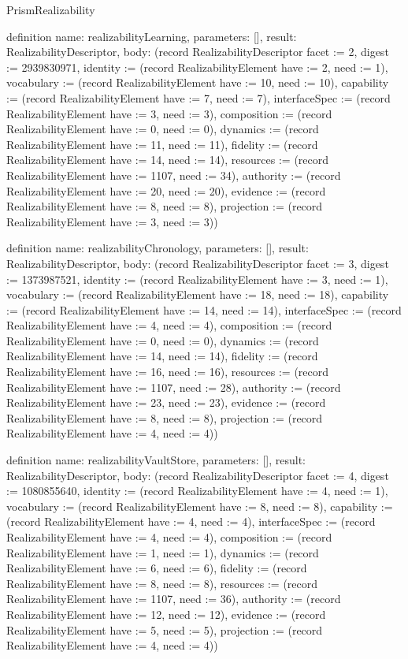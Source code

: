 \begin{lexlean}{PrismRealizability}
\begin{semanticmodule}
definition{
  name: realizabilityLearning,
  parameters: [],
  result: RealizabilityDescriptor,
  body: (record RealizabilityDescriptor {facet := 2, digest := 2939830971, identity := (record RealizabilityElement {have := 2, need := 1}), vocabulary := (record RealizabilityElement {have := 10, need := 10}), capability := (record RealizabilityElement {have := 7, need := 7}), interfaceSpec := (record RealizabilityElement {have := 3, need := 3}), composition := (record RealizabilityElement {have := 0, need := 0}), dynamics := (record RealizabilityElement {have := 11, need := 11}), fidelity := (record RealizabilityElement {have := 14, need := 14}), resources := (record RealizabilityElement {have := 1107, need := 34}), authority := (record RealizabilityElement {have := 20, need := 20}), evidence := (record RealizabilityElement {have := 8, need := 8}), projection := (record RealizabilityElement {have := 3, need := 3})})
}

definition{
  name: realizabilityChronology,
  parameters: [],
  result: RealizabilityDescriptor,
  body: (record RealizabilityDescriptor {facet := 3, digest := 1373987521, identity := (record RealizabilityElement {have := 3, need := 1}), vocabulary := (record RealizabilityElement {have := 18, need := 18}), capability := (record RealizabilityElement {have := 14, need := 14}), interfaceSpec := (record RealizabilityElement {have := 4, need := 4}), composition := (record RealizabilityElement {have := 0, need := 0}), dynamics := (record RealizabilityElement {have := 14, need := 14}), fidelity := (record RealizabilityElement {have := 16, need := 16}), resources := (record RealizabilityElement {have := 1107, need := 28}), authority := (record RealizabilityElement {have := 23, need := 23}), evidence := (record RealizabilityElement {have := 8, need := 8}), projection := (record RealizabilityElement {have := 4, need := 4})})
}

definition{
  name: realizabilityVaultStore,
  parameters: [],
  result: RealizabilityDescriptor,
  body: (record RealizabilityDescriptor {facet := 4, digest := 1080855640, identity := (record RealizabilityElement {have := 4, need := 1}), vocabulary := (record RealizabilityElement {have := 8, need := 8}), capability := (record RealizabilityElement {have := 4, need := 4}), interfaceSpec := (record RealizabilityElement {have := 4, need := 4}), composition := (record RealizabilityElement {have := 1, need := 1}), dynamics := (record RealizabilityElement {have := 6, need := 6}), fidelity := (record RealizabilityElement {have := 8, need := 8}), resources := (record RealizabilityElement {have := 1107, need := 36}), authority := (record RealizabilityElement {have := 12, need := 12}), evidence := (record RealizabilityElement {have := 5, need := 5}), projection := (record RealizabilityElement {have := 4, need := 4})})
}


\end{semanticmodule}
\end{lexlean}
